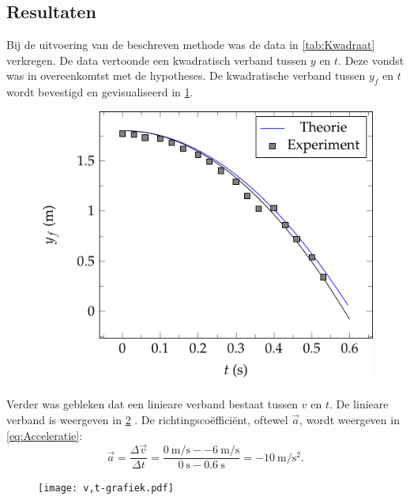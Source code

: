\documentclass[•]{scrartcl}
\begin{document}
\subsection{Resultaten}
Bij de uitvoering van de beschreven methode was de data in \cref{tab:Kwadraat} verkregen. De data vertoonde een kwadratisch verband tussen $y$ en $t$.  Deze vondst was in overeenkomtst met de hypotheses.        
De kwadratische verband tussen $y_f$ en $t$ wordt bevestigd en gevisualiseerd in \cref{fig:kwadraat}.
\begin{figure}
\centering
\includegraphics[scale=1]{Grafiekvalbeweging.pdf}
\label{fig:kwadraat}
\end{figure} 
Verder was gebleken dat een linieare verband bestaat tussen $v$ en $t$. De linieare verband is weergeven in \cref{fig:liniear} . De richtingsco\"{e}ffici\"{e}nt, oftewel $\vec{a}$, wordt weergeven in \cref{eq:Acceleratie}:
\begin{equation}\label{eq:Acceleratie}
\vec{a}=\frac{\Delta \vec{v}}{\Delta t}=\frac{\SI{0}{\meter\per\second}-\SI{-6}{\meter\per\second}}{\SI{0}{\second}-\SI{0.6}{\second}}=\SI{-10}{\meter\per\second\squared}\mathrm{.}
\end{equation}	
\begin{figure}[t]
\centering
\texttt{[image: v,t-grafiek.pdf]}
\label{fig:liniear}
\end{figure}
\end{document}

